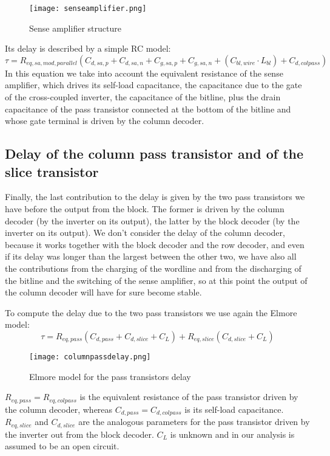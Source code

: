 \begin{figure}[h] 
	\begin{center}
		\texttt{[image: senseamplifier.png]}
	\end{center}
	\caption{Sense amplifier structure} 
\end{figure}

Its delay is described by a simple RC model:
$$\tau=R_{eq,sa,mod,parallel}(C_{d,sa,p}+C_{d,sa,n}+C_{g,sa,p}+C_{g,sa,n}+(C_{bl,wire}\cdot L_{bl})+C_{d,colpass})$$
In this equation we take into account the equivalent resistance of the sense amplifier, which drives its self-load capacitance, the capacitance due to the gate of the cross-coupled inverter, the capacitance of the bitline, plus the drain capacitance of the pass transistor connected at the bottom of the bitline and whose gate terminal is driven by the column decoder.

\subsection{Delay of the column pass transistor and of the slice transistor}
Finally, the last contribution to the delay is given by the two pass transistors we have before the output from the block. The former is driven by the column decoder (by the inverter on its output), the latter by the block decoder (by the inverter on its output). We don't consider the delay of the column decoder, because it works together with the block decoder and the row decoder, and even if its delay was longer than the largest between the other two, we have also all the contributions from the charging of the wordline and from the discharging of the bitline and the switching of the sense amplifier, so at this point the output of the column decoder will have for sure become stable.   

To compute the delay due to the two pass transistors we use again the Elmore model:
$$\tau=R_{eq,pass}(C_{d,pass}+C_{d,slice}+C_L)+R_{eq,slice}(C_{d,slice}+C_L)$$

\begin{figure}[h] 
	\begin{center}
		\texttt{[image: columnpassdelay.png]}
	\end{center}
	\caption{Elmore model for the pass transistors delay} 
\end{figure}

$R_{eq,pass}=R_{eq,colpass}$ is the equivalent resistance of the pass transistor driven by the column decoder, whereas $C_{d,pass}=C_{d,colpass}$ is its self-load capacitance. $R_{eq,slice}$ and $C_{d,slice}$ are the analogous parameters for the pass transistor driven by the inverter out from the block decoder. $C_L$ is unknown and in our analysis is assumed to be an open circuit. \\

